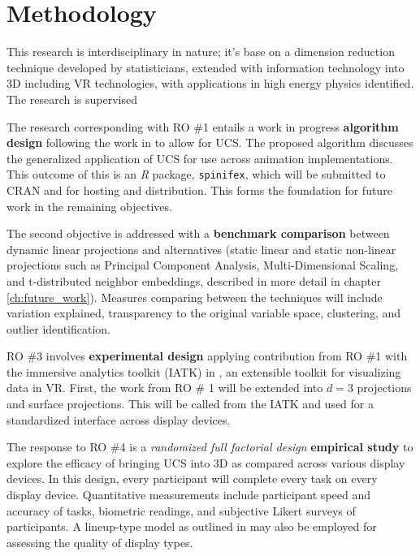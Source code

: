 \documentclass{monashthesis}
\begin{document}
\section{Methodology}\label{methodology}

This research is interdisciplinary in nature; it's base on a dimension
reduction technique developed by statisticians, extended with
information technology into 3D including VR technologies, with
applications in high energy physics
identified\autocite{cook_dynamical_2018}. The research is supervised

The research corresponding with RO \#1 entails a work in progress
\textbf{algorithm design} following the work in
\textcite{cook_manual_1997} to allow for UCS. The proposed algorithm
discusses the generalized application of UCS for use across animation
implementations. This outcome of this is an \emph{R} package,
\texttt{spinifex}, which will be submitted to CRAN and for hosting and
distribution. This forms the foundation for future work in the remaining
objectives.

The second objective is addressed with a \textbf{benchmark comparison}
between dynamic linear projections and alternatives (static linear and
static non-linear projections such as Principal Component Analysis,
Multi-Dimensional Scaling, and t-distributed neighbor embeddings,
described in more detail in chapter \ref{ch:future_work}). Measures
comparing between the techniques will include variation explained,
transparency to the original variable space, clustering, and outlier
identification.

RO \#3 involves \textbf{experimental design} applying contribution from
RO \#1 with the immersive analytics toolkit (IATK) in
\textcite{cordeil_immersive_2019}, an extensible toolkit for visualizing
data in VR. First, the work from RO \# 1 will be extended into \(d=3\)
projections and surface projections. This will be called from the IATK
and used for a standardized interface across display devices.

The response to RO \#4 is a \emph{randomized full factorial design}
\textbf{empirical study} to explore the efficacy of bringing UCS into 3D
as compared across various display devices. In this design, every
participant will complete every task on every display device.
Quantitative measurements include participant speed and accuracy of
tasks, biometric readings, and subjective Likert surveys of
participants. A lineup-type model as outlined in
\textcite{hofmann_graphical_2012} may also be employed for assessing the
quality of display types.
\end{document}
